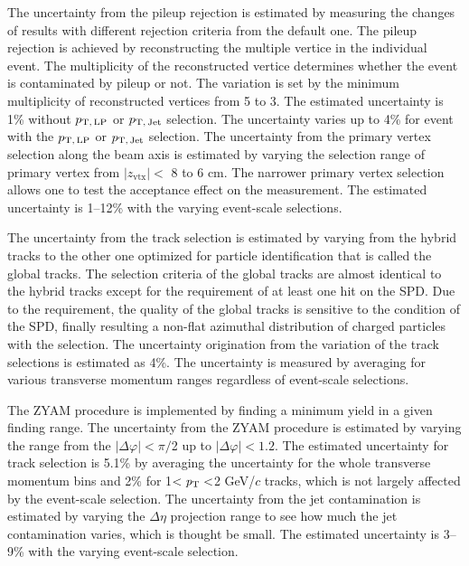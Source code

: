 The uncertainty from the pileup rejection is estimated by measuring the changes of results with different rejection criteria from the default one. The pileup rejection is achieved by reconstructing the multiple vertice in the individual event. The multiplicity of the reconstructed vertice determines whether the event is contaminated by pileup or not. The variation is set by the minimum multiplicity of reconstructed vertices from 5 to 3. 
The estimated uncertainty is 1\% without $p_\mathrm{T,\,LP}$ or $p_\mathrm{T,\,Jet}$ selection. The uncertainty varies up to 4\% for event with the $p_\mathrm{T,\,LP}$ or $p_\mathrm{T,\,Jet}$ selection. The uncertainty from the primary vertex selection along the beam axis is estimated by varying the selection range of primary vertex from $|z_\mathrm{vtx}|<$ 8 to 6 cm. The narrower primary vertex selection allows one to test the acceptance effect on the measurement. The estimated uncertainty is 1--12\% with the varying event-scale selections.

The uncertainty from the track selection is estimated by varying from the hybrid tracks to the other one optimized for particle identification that is called the global tracks. The selection criteria of the global tracks are almost identical to the hybrid tracks except for the requirement of at least one hit on the SPD. Due to the requirement, the quality of the global tracks is sensitive to the condition of the SPD, finally resulting a non-flat azimuthal distribution of charged particles with the selection.     
The uncertainty origination from the variation of the track selections is estimated as 4\%. The uncertainty is measured by averaging for various transverse momentum ranges regardless of event-scale selections.

The ZYAM procedure is implemented by finding a minimum yield in a given finding range. The uncertainty from the ZYAM procedure is estimated by varying the range from the $|\Delta\varphi|<\pi/$2 up to $|\Delta\varphi|<1.2$. The estimated uncertainty for track selection is 5.1\% by averaging the uncertainty for the whole transverse momentum bins and 2\% for 1$<\it{p}_{\rm{T}}<$2 GeV/$c$ tracks, which is not largely affected by the event-scale selection. The uncertainty from the jet contamination is estimated by varying the $\Delta\eta$ projection range to see how much the jet contamination varies, which is thought be small. The estimated uncertainty is 3--9\% with the varying event-scale selection.

